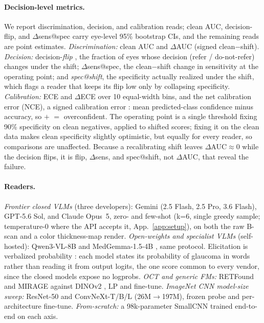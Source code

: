 \paragraph{Decision-level metrics.} We report discrimination, decision, and calibration reads; clean AUC, decision-flip, and
$\Delta$sens@spec carry eye-level 95\% bootstrap CIs, and the remaining reads are point estimates. \emph{Discrimination:} clean AUC and $\Delta$AUC (signed clean$-$shift). \emph{Decision:}
decision-\emph{flip} \citep{hendrycks2019corruptions}, the fraction of eyes whose decision (refer / do-not-refer)
changes under the shift; $\Delta$sens@spec, the clean$-$shift change in sensitivity at the operating point; and
\emph{spec@shift}, the specificity actually realized under the shift, which flags a reader that keeps its flip low
only by collapsing specificity. \emph{Calibration:} ECE and $\Delta$ECE \citep{guo2017calibration} over 10
equal-width bins, and the net calibration error (NCE), a signed calibration error \citep{groot2024overconfidence}:
mean predicted-class confidence minus accuracy, so $+$ $=$ overconfident. The operating point is a single threshold fixing 90\% specificity
on clean negatives, applied to shifted scores; fixing it on the clean data makes clean specificity slightly
optimistic, but equally for every reader, so comparisons are unaffected. Because a recalibrating shift leaves
$\Delta$AUC$\approx$0 while the decision flips, it is flip, $\Delta$sens, and spec@shift, not $\Delta$AUC, that reveal the failure.

\paragraph{Readers.} \emph{Frontier closed VLMs} (three developers): Gemini (2.5 Flash, 2.5 Pro, 3.6 Flash),
GPT-5.6 Sol, and Claude Opus~5, zero- and few-shot (k{=}6, single greedy sample; temperature-0 where the API accepts
it, App.~\ref{app:setup}), on both the raw B-scan and a color
thickness-map render. \emph{Open-weights
and specialist VLMs} (self-hosted): Qwen3-VL-8B \citep{qwen3vl2025} and MedGemma-1.5-4B \citep{medgemma15_2026}, same protocol. Elicitation is verbalized
probability \citep{tian2023calibration}: each model states its probability of glaucoma in words rather than reading
it from output logits, the one score common to every vendor, since the closed models expose no
logprobs. \emph{OCT and generic FMs:} RETFound \citep{zhou2023retfound} and MIRAGE \citep{morano2025mirage} against DINOv2 \citep{oquab2023dinov2}, LP and fine-tune.
\emph{ImageNet CNN model-size sweep:} ResNet-50 and ConvNeXt-T/B/L (26M$\rightarrow$197M), frozen probe and
per-architecture fine-tune. \emph{From-scratch:} a 98k-parameter SmallCNN trained end-to-end on each axis.

